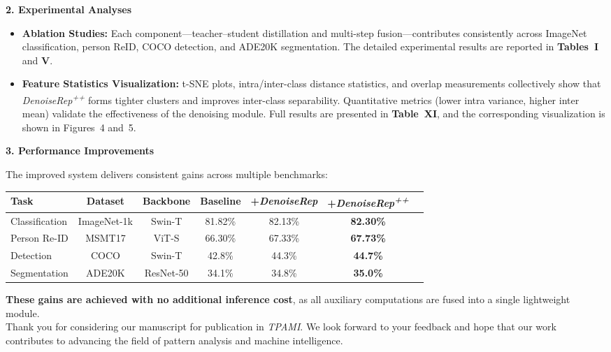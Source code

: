 \documentclass[11pt]{article}
\begin{document}
\vspace{0.6em}
\textbf{2. Experimental Analyses}

\begin{itemize}

    \item \textbf{Ablation Studies:}  
    Each component—teacher–student distillation and multi-step fusion—contributes consistently 
    across ImageNet classification, person ReID, COCO detection, and ADE20K segmentation.  
    The detailed experimental results are reported in \textbf{Tables~I} and \textbf{V}.

    \item \textbf{Feature Statistics Visualization:}  
    t-SNE plots, intra/inter-class distance statistics, and overlap measurements collectively show that 
    \textit{DenoiseRep\textsuperscript{++}} forms tighter clusters and improves inter-class separability.  
    Quantitative metrics (lower intra variance, higher inter mean) validate the effectiveness of the denoising module.  
    Full results are presented in \textbf{Table~XI}, and the corresponding visualization is shown in Figures~4 and~5.

\end{itemize}


\vspace{0.6em}
\textbf{3. Performance Improvements}

The improved system delivers consistent gains across multiple benchmarks:

\begin{center} \begin{tabular}{lcccccc} \toprule \textbf{Task} & \textbf{Dataset} & \textbf{Backbone} & \textbf{Baseline} & \textbf{+\textit{DenoiseRep}} & \textbf{+\textit{DenoiseRep\textsuperscript{++}}} \\ \midrule Classification & ImageNet-1k & Swin-T & 81.82\% & 82.13\% & \textbf{82.30\%} \\ Person Re-ID & MSMT17 & ViT-S & 66.30\% & 67.33\% & \textbf{67.73\%} \\ Detection & COCO & Swin-T & 42.8\% & 44.3\% & \textbf{44.7\%} \\ Segmentation & ADE20K & ResNet-50 & 34.1\% & 34.8\% & \textbf{35.0\%} \\ \bottomrule \end{tabular} \end{center}

\textbf{These gains are achieved with no additional inference cost},  
as all auxiliary computations are fused into a single lightweight module.\\[1.0em]


\hspace*{2em}
Thank you for considering our manuscript for publication in \textit{TPAMI}. 
We look forward to your feedback and hope that our work contributes to advancing 
the field of pattern analysis and machine intelligence.




\end{document}
